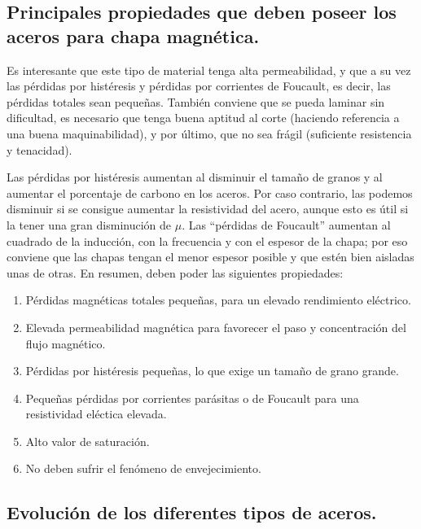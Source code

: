 \documentclass[12pt,a4paper]{article}
\begin{document}
\subsection{Principales propiedades que deben poseer los aceros para chapa magnética.}

Es interesante que este tipo de material tenga alta permeabilidad, y que a su vez las pérdidas por histéresis y pérdidas por corrientes de Foucault, es decir, las pérdidas totales sean pequeñas. También conviene que se pueda laminar sin dificultad, es necesario que tenga buena aptitud al corte (haciendo referencia a una buena maquinabilidad), y por último, que no sea frágil (suficiente resistencia y tenacidad).

Las pérdidas por histéresis aumentan al disminuir el tamaño de granos y al aumentar el porcentaje de carbono en los aceros. Por caso contrario, las podemos disminuir si se consigue aumentar la resistividad del acero, aunque esto es útil si la tener una gran disminución de $\mu$. Las \enquote{pérdidas de Foucault} aumentan al cuadrado de la inducción, con la frecuencia y con el espesor de la chapa; por eso conviene que las chapas tengan el menor espesor posible y que estén bien aisladas unas de otras. En resumen, deben poder las siguientes propiedades:

\begin{enumerate}
    \item Pérdidas magnéticas totales pequeñas, para un elevado rendimiento eléctrico.
    \item Elevada permeabilidad magnética para favorecer el paso y concentración del flujo magnético.
    \item Pérdidas por histéresis pequeñas, lo que exige un tamaño de grano grande.
    \item Pequeñas pérdidas por corrientes parásitas o de Foucault para una resistividad eléctica elevada.
    \item Alto valor de saturación.
    \item No deben sufrir el fenómeno de envejecimiento.
\end{enumerate}

\subsection{Evolución de los diferentes tipos de aceros.} \label{silicio}
\end{document}
